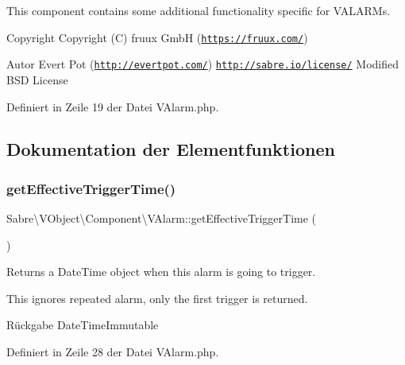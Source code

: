 This component contains some additional functionality specific for V\+A\+L\+A\+R\+Ms.

\begin{DoxyCopyright}{Copyright}
Copyright (C) fruux GmbH (\href{https://fruux.com/}{\tt https\+://fruux.\+com/}) 
\end{DoxyCopyright}
\begin{DoxyAuthor}{Autor}
Evert Pot (\href{http://evertpot.com/}{\tt http\+://evertpot.\+com/})  \href{http://sabre.io/license/}{\tt http\+://sabre.\+io/license/} Modified B\+SD License 
\end{DoxyAuthor}


Definiert in Zeile 19 der Datei V\+Alarm.\+php.



\subsection{Dokumentation der Elementfunktionen}
\mbox{\label{class_sabre_1_1_v_object_1_1_component_1_1_v_alarm_a58b73ccd3fff7b8d102482b021581675}} 
\subsubsection{\texorpdfstring{get\+Effective\+Trigger\+Time()}{getEffectiveTriggerTime()}}
{\footnotesize\ttfamily Sabre\textbackslash{}\+V\+Object\textbackslash{}\+Component\textbackslash{}\+V\+Alarm\+::get\+Effective\+Trigger\+Time (\begin{DoxyParamCaption}{ }\end{DoxyParamCaption})}

Returns a Date\+Time object when this alarm is going to trigger.

This ignores repeated alarm, only the first trigger is returned.

\begin{DoxyReturn}{Rückgabe}
Date\+Time\+Immutable 
\end{DoxyReturn}


Definiert in Zeile 28 der Datei V\+Alarm.\+php.

